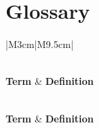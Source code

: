 
\chapter{Glossary}

\hspace{4em}%

\begin{longtable}{|M{3cm}|M{9.5cm}|}

    \caption{Glossary of key terms and concepts used in this study}
    \label{table:glossary}

    \\ \hline
    \textbf{Term} & \textbf{Definition}
    \\ \hline
    \endfirsthead

    \caption[]{Glossary of key terms and concepts used in this study, continued}
    \\ \hline
    \textbf{Term} & \textbf{Definition}
    \\ \hline                        
    \endhead
 

\end{longtable}
